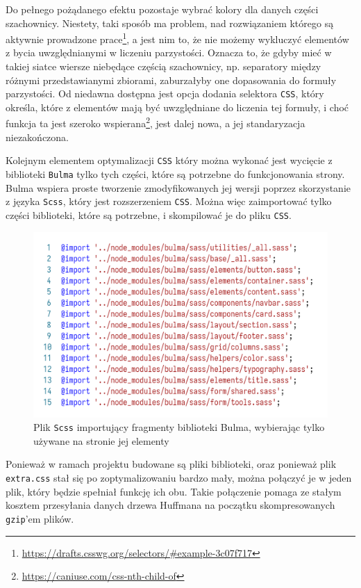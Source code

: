 \documentclass[licencjacka]{pracadypl}
\begin{document}
Do pełnego pożądanego efektu pozostaje wybrać kolory dla danych części szachownicy. Niestety, taki sposób ma problem, nad rozwiązaniem którego są aktywnie prowadzone prace\footnote{\url{https://drafts.csswg.org/selectors/\#example-3c07f717}}, a jest nim to, że nie możemy wykluczyć elementów z bycia uwzględnianymi w liczeniu parzystości. Oznacza to, że gdyby mieć w takiej siatce wiersze niebędące częścią szachownicy, np. separatory między różnymi przedstawianymi zbiorami, zaburzałyby one dopasowania do formuły parzystości. Od niedawna dostępna jest opcja dodania selektora \texttt{CSS}, który określa, które z elementów mają być uwzględniane do liczenia tej formuły, i choć funkcja ta jest szeroko wspierana\footnote{\url{https://caniuse.com/css-nth-child-of}}, jest dalej nowa, a jej standaryzacja niezakończona.

Kolejnym elementem optymalizacji \texttt{CSS} który można wykonać jest wycięcie z biblioteki \texttt{Bulma} tylko tych części, które są potrzebne do funkcjonowania strony. Bulma wspiera proste tworzenie zmodyfikowanych jej wersji poprzez skorzystanie z języka \texttt{Scss}, który jest rozszerzeniem \texttt{CSS}. Można więc zaimportować tylko części biblioteki, które są potrzebne, i skompilować je do pliku \texttt{CSS}.

\begin{figure}[H]
  \centering
  \includegraphics[width=\linewidth/\real{1.5}]{images/code-scss-import-bulma.png}
  \caption{Plik \texttt{Scss} importujący fragmenty biblioteki Bulma, wybierając tylko używane na stronie jej elementy}
  \label{fig:code-scss-import-bulma}
\end{figure}

Ponieważ w ramach projektu budowane są pliki biblioteki, oraz ponieważ plik \texttt{extra.css} stał się po zoptymalizowaniu bardzo mały, można połączyć je w jeden plik, który będzie spełniał funkcję ich obu. Takie połączenie pomaga ze stałym kosztem przesyłania danych drzewa Huffmana na początku skompresowanych \texttt{gzip}'em plików.
\end{document}
